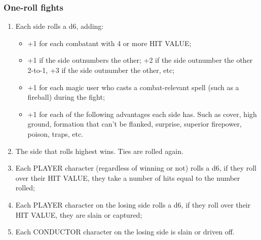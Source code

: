 \subsubsection{One-roll fights}
\begin{enumerate}
    \item {Each side rolls a d6, adding:}
    \begin{itemize}
        \item {+1 for each combatant with 4 or more HIT VALUE;}
        \item {+1 if the side outnumbers the other; +2 if the side outnumber the other 2-to-1, +3 if the side outnumber the other, etc;}
        \item {+1 for each magic user who casts a combat-relevant spell (such as a fireball) during the fight;}
        \item {+1 for each of the following advantages each side has. Such as cover, high ground, formation that can't be flanked, surprise, superior firepower, poison, traps, etc.}
    \end{itemize}
    \item {The side that rolls highest wins. Ties are rolled again.}
    \item {Each PLAYER character (regardless of winning or not) rolls a d6, if they roll over their HIT VALUE, they take a number of hits equal to the number rolled;}
    \item {Each PLAYER character on the losing side rolls a d6, if they roll over their HIT VALUE, they are slain or captured;}
    \item {Each CONDUCTOR character on the losing side is slain or driven off.}
\end{enumerate}

